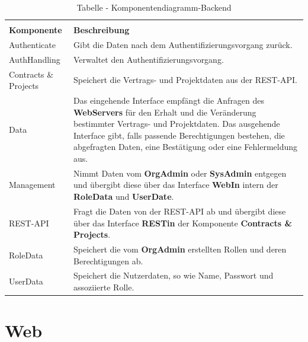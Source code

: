 \begin{longtable}[h]{p{4cm} p{10.0cm}}
	\caption{Tabelle - Komponentendiagramm-Backend}
	\centering
	\label{tab:table_comp_backend}
	\endlastfoot
	\multicolumn{2}{r}{{Weitergeführt auf der folgenden Seite}} \\
	\endfoot
	\endhead
	\rowcolor[HTML]{C0C0C0} 
	\textbf{Komponente} & \textbf{Beschreibung} \\ 
	
	Authenticate & Gibt die Daten nach dem Authentifizierungsvorgang zurück. \\
	
	\rowcolor[HTML]{E7E7E7} 
	AuthHandling & Verwaltet den Authentifizierungsvorgang.  \\
	
	Contracts {\&} Projects & Speichert die Vertrags- und Projektdaten aus der REST-API. \\
	
	\rowcolor[HTML]{E7E7E7} 
	Data & Das eingehende Interface empfängt die Anfragen des \textbf{WebServers} für den Erhalt und die Veränderung bestimmter Vertrags- und Projektdaten. Das ausgehende Interface gibt, falls passende Berechtigungen bestehen, die abgefragten Daten, eine Bestätigung oder eine Fehlermeldung aus.  \\
	
	Management & Nimmt Daten vom \textbf{OrgAdmin} oder \textbf{SysAdmin} entgegen und übergibt diese über das Interface \textbf{WebIn} intern der \textbf{RoleData} und \textbf{UserDate}. \\
	
	\rowcolor[HTML]{E7E7E7} 
	REST-API & Fragt die Daten von der REST-API ab und übergibt diese über das Interface \textbf{RESTin} der Komponente \textbf{Contracts {\&} Projects}. \\
	
	RoleData & Speichert die vom \textbf{OrgAdmin} erstellten Rollen und deren Berechtigungen ab. \\
	
	\rowcolor[HTML]{E7E7E7} 
	UserData & Speichert die Nutzerdaten, so wie Name, Passwort und assoziierte Rolle.
\end{longtable}

\clearpage

\section{Web}

